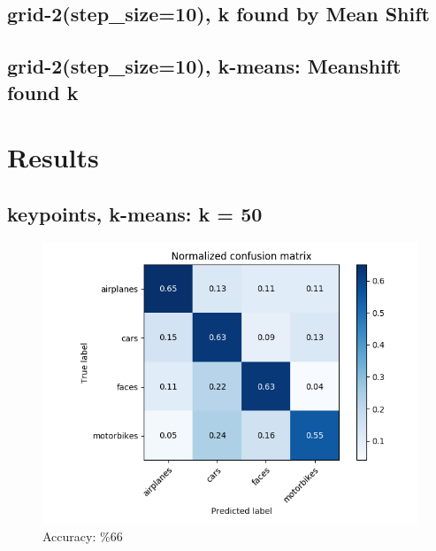 \subsection*{grid-2(step\_size=10), k found by Mean Shift}
\subsection*{grid-2(step\_size=10), k-means: Meanshift found k}



\section*{Results}

\subsection*{keypoints, k-means: k = 50}
\begin{figure}[H]
    \centering
    \includegraphics[width=\textwidth]{images/confusion-kp-50.png}
    \caption*{Accuracy: \%66}
\end{figure}

